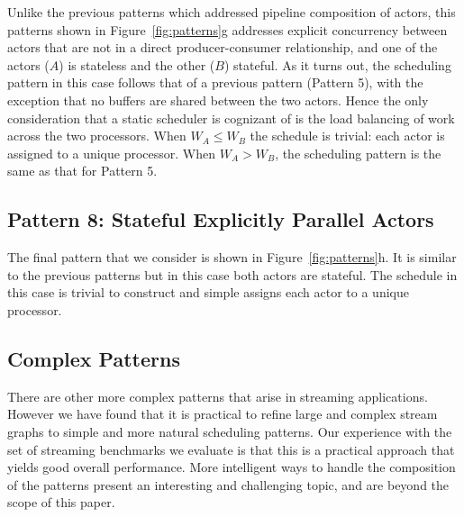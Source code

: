 Unlike the previous patterns which addressed pipeline composition of
actors, this patterns shown in Figure~\ref{fig:patterns}g addresses
explicit concurrency between actors that are not in a direct
producer-consumer relationship, and one of the actors ($A$) is
stateless and the other ($B$) stateful. As it turns out, the
scheduling pattern in this case follows that of a previous pattern
(Pattern 5), with the exception that no buffers are shared between the
two actors. Hence the only consideration that a static scheduler  is
cognizant of is the load balancing of work across the two
processors. When $W_A \le W_B$ the schedule is trivial: each actor is
assigned to a unique processor. When $W_A > W_B$, the scheduling
pattern is the same as that for Pattern 5.

\subsection{Pattern 8: Stateful Explicitly Parallel Actors}

The final pattern that we consider is shown in
Figure~\ref{fig:patterns}h. It is similar to the previous patterns but
in this case both actors are stateful. The schedule in this case is
trivial to construct and simple assigns each actor to a unique
processor.

\subsection{Complex Patterns}


There are other more complex patterns that arise in streaming
applications. However we have found that it is practical to refine
large and complex stream graphs to simple and more natural scheduling
patterns. Our experience with the set of streaming benchmarks we
evaluate is that this is a practical approach that yields good overall
performance. More intelligent ways to handle the composition of the
patterns present an interesting and challenging topic, and are beyond
the scope of this paper.


